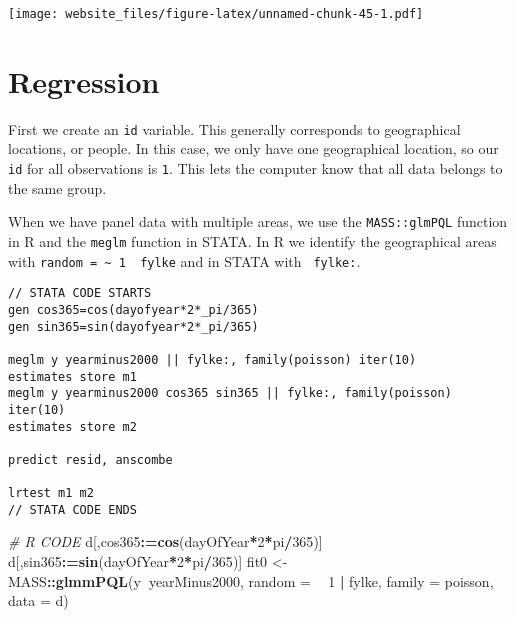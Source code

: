 \documentclass[]{book}
\newenvironment{Shaded}{\begin{snugshade}}{\end{snugshade}}
\newcommand{\KeywordTok}[1]{\textcolor[rgb]{0.13,0.29,0.53}{\textbf{#1}}}
\newcommand{\DataTypeTok}[1]{\textcolor[rgb]{0.13,0.29,0.53}{#1}}
\newcommand{\DecValTok}[1]{\textcolor[rgb]{0.00,0.00,0.81}{#1}}
\newcommand{\StringTok}[1]{\textcolor[rgb]{0.31,0.60,0.02}{#1}}
\newcommand{\CommentTok}[1]{\textcolor[rgb]{0.56,0.35,0.01}{\textit{#1}}}
\newcommand{\OperatorTok}[1]{\textcolor[rgb]{0.81,0.36,0.00}{\textbf{#1}}}
\newcommand{\ErrorTok}[1]{\textcolor[rgb]{0.64,0.00,0.00}{\textbf{#1}}}
\newcommand{\NormalTok}[1]{#1}
\begin{document}
\begin{Shaded}
\end{Shaded}

\texttt{[image: website\_files/figure-latex/unnamed-chunk-45-1.pdf]}

\newpage

\section{Regression}\label{regression-1}

First we create an \texttt{id} variable. This generally corresponds to
geographical locations, or people. In this case, we only have one
geographical location, so our \texttt{id} for all observations is
\texttt{1}. This lets the computer know that all data belongs to the
same group.

When we have panel data with multiple areas, we use the
\texttt{MASS::glmPQL} function in R and the \texttt{meglm} function in
STATA. In R we identify the geographical areas with
\texttt{random\ =\ \textasciitilde{}\ 1\ \textbar{}\ fylke} and in STATA
with \texttt{\textbar{}\textbar{}\ fylke:}.

\begin{verbatim}
// STATA CODE STARTS
gen cos365=cos(dayofyear*2*_pi/365)
gen sin365=sin(dayofyear*2*_pi/365)

meglm y yearminus2000 || fylke:, family(poisson) iter(10)
estimates store m1
meglm y yearminus2000 cos365 sin365 || fylke:, family(poisson) iter(10)
estimates store m2

predict resid, anscombe

lrtest m1 m2
// STATA CODE ENDS
\end{verbatim}

\begin{Shaded}
\begin{Highlighting}[]
\CommentTok{# R CODE}
\NormalTok{d[,cos365}\OperatorTok{:}\ErrorTok{=}\KeywordTok{cos}\NormalTok{(dayOfYear}\OperatorTok{*}\DecValTok{2}\OperatorTok{*}\NormalTok{pi}\OperatorTok{/}\DecValTok{365}\NormalTok{)]}
\NormalTok{d[,sin365}\OperatorTok{:}\ErrorTok{=}\KeywordTok{sin}\NormalTok{(dayOfYear}\OperatorTok{*}\DecValTok{2}\OperatorTok{*}\NormalTok{pi}\OperatorTok{/}\DecValTok{365}\NormalTok{)]}
\NormalTok{fit0 <-}\StringTok{ }\NormalTok{MASS}\OperatorTok{::}\KeywordTok{glmmPQL}\NormalTok{(y}\OperatorTok{~}\NormalTok{yearMinus2000, }\DataTypeTok{random =} \OperatorTok{~}\StringTok{ }\DecValTok{1} \OperatorTok{|}\StringTok{ }\NormalTok{fylke,}
                \DataTypeTok{family =}\NormalTok{ poisson, }\DataTypeTok{data =}\NormalTok{ d)}
\end{Highlighting}
\end{Shaded}
\end{document}
